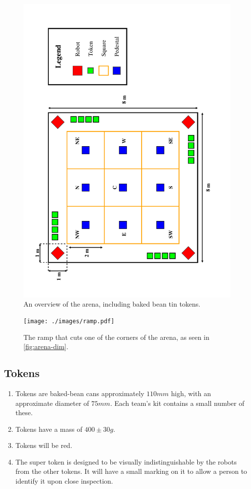 \begin{figure}
  \includegraphics[keepaspectratio, clip, width=\textwidth]{./images/arena.pdf}
  \caption{\label{fig:arena-dim}An overview of the arena, including baked bean tin tokens.}
\end{figure}

\begin{figure}
  \begin{center}
    \texttt{[image: ./images/ramp.pdf]}
  \end{center}
  \caption{\label{fig:ramp-on-its-own}The ramp that cuts one of the corners of the arena, as seen in \autoref{fig:arena-dim}.}
\end{figure}

\subsection{Tokens}
\label{sub:Tokens}
\begin {enumerate}
\item Tokens are baked-bean cans approximately $110mm$ high, with an approximate diameter of $75mm$.
 Each team's kit contains a small number of these.
\item Tokens have a mass of $400\pm30g$.
\item Tokens will be red.
\item The super token is designed to be visually indistinguishable by the robots from the other tokens.  It will have a small marking on it to allow a person to identify it upon close inspection.
\end {enumerate}

